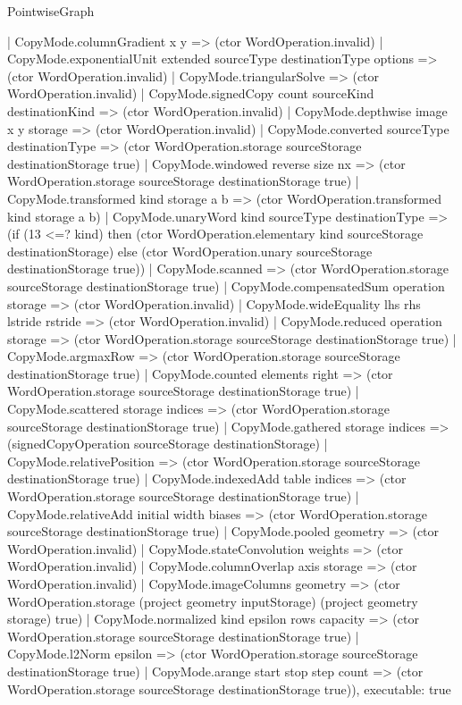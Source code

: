 \begin{lexlean}{PointwiseGraph}
\begin{semanticmodule}
{    | CopyMode.columnGradient x y => (ctor WordOperation.invalid)
    | CopyMode.exponentialUnit extended sourceType destinationType options => (ctor WordOperation.invalid)
    | CopyMode.triangularSolve => (ctor WordOperation.invalid)
    | CopyMode.signedCopy count sourceKind destinationKind => (ctor WordOperation.invalid)
    | CopyMode.depthwise image x y storage => (ctor WordOperation.invalid)
    | CopyMode.converted sourceType destinationType => (ctor WordOperation.storage sourceStorage destinationStorage true)
    | CopyMode.windowed reverse size nx => (ctor WordOperation.storage sourceStorage destinationStorage true)
    | CopyMode.transformed kind storage a b => (ctor WordOperation.transformed kind storage a b)
    | CopyMode.unaryWord kind sourceType destinationType => (if (13 <=? kind) then (ctor WordOperation.elementary kind sourceStorage destinationStorage) else (ctor WordOperation.unary sourceStorage destinationStorage true))
    | CopyMode.scanned => (ctor WordOperation.storage sourceStorage destinationStorage true)
    | CopyMode.compensatedSum operation storage => (ctor WordOperation.invalid)
    | CopyMode.wideEquality lhs rhs lstride rstride => (ctor WordOperation.invalid)
    | CopyMode.reduced operation storage => (ctor WordOperation.storage sourceStorage destinationStorage true)
    | CopyMode.argmaxRow => (ctor WordOperation.storage sourceStorage destinationStorage true)
    | CopyMode.counted elements right => (ctor WordOperation.storage sourceStorage destinationStorage true)
    | CopyMode.scattered storage indices => (ctor WordOperation.storage sourceStorage destinationStorage true)
    | CopyMode.gathered storage indices => (signedCopyOperation sourceStorage destinationStorage)
    | CopyMode.relativePosition => (ctor WordOperation.storage sourceStorage destinationStorage true)
    | CopyMode.indexedAdd table indices => (ctor WordOperation.storage sourceStorage destinationStorage true)
    | CopyMode.relativeAdd initial width biases => (ctor WordOperation.storage sourceStorage destinationStorage true)
    | CopyMode.pooled geometry => (ctor WordOperation.invalid)
    | CopyMode.stateConvolution weights => (ctor WordOperation.invalid)
    | CopyMode.columnOverlap axis storage => (ctor WordOperation.invalid)
    | CopyMode.imageColumns geometry => (ctor WordOperation.storage (project geometry inputStorage) (project geometry storage) true)
    | CopyMode.normalized kind epsilon rows capacity => (ctor WordOperation.storage sourceStorage destinationStorage true)
    | CopyMode.l2Norm epsilon => (ctor WordOperation.storage sourceStorage destinationStorage true)
    | CopyMode.arange start stop step count => (ctor WordOperation.storage sourceStorage destinationStorage true)),
  executable: true
}


\end{semanticmodule}
\end{lexlean}
